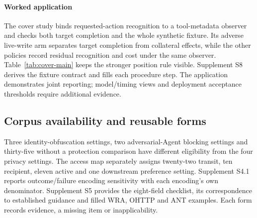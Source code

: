 \paragraph{Worked application}
The cover study binds requested-action recognition to a tool-metadata observer and checks both target completion and the whole synthetic fixture. Its adverse live-write arm separates target completion from collateral effects, while the other policies record residual recognition and cost under the same observer. Table~\ref{tab:cover-main} keeps the stronger position rule visible. Supplement S8 derives the fixture contract and fills each procedure step. The application demonstrates joint reporting; model/timing views and deployment acceptance thresholds require additional evidence.

\subsection{Corpus availability and reusable forms}
Three identity-obfuscation settings, two adversarial-Agent blocking settings and thirty-five without a protection comparison have different eligibility from the four privacy settings. The access map separately assigns twenty-two transit, ten recipient, eleven active and one downstream preference setting. Supplement S4.1 reports outcome/failure encoding sensitivity with each encoding's own denominator. Supplement S5 provides the eight-field checklist, its correspondence to established guidance and filled WRA, OHTTP and ANT examples. Each form records evidence, a missing item or inapplicability.
